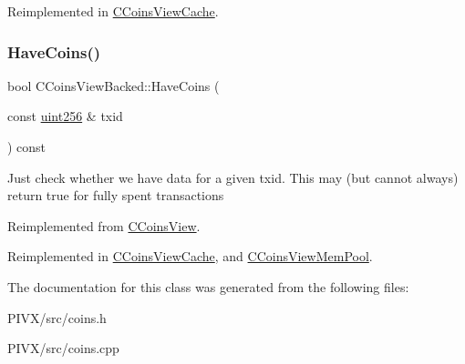 Reimplemented in \mbox{\hyperlink{class_c_coins_view_cache_a561bb7c6c97701b12c48fbbb563d0a91}{C\+Coins\+View\+Cache}}.

\mbox{\label{class_c_coins_view_backed_ad49041658bdec807d556e080476e6543}} 
\subsubsection{\texorpdfstring{Have\+Coins()}{HaveCoins()}}
{\footnotesize\ttfamily bool C\+Coins\+View\+Backed\+::\+Have\+Coins (\begin{DoxyParamCaption}\item[{const \mbox{\hyperlink{classuint256}{uint256}} \&}]{txid }\end{DoxyParamCaption}) const\hspace{0.3cm}{\ttfamily [virtual]}}

Just check whether we have data for a given txid. This may (but cannot always) return true for fully spent transactions 

Reimplemented from \mbox{\hyperlink{class_c_coins_view_ade3a65fc3f1b02baf7bebce630e4eba3}{C\+Coins\+View}}.



Reimplemented in \mbox{\hyperlink{class_c_coins_view_cache_aa8f0c55b6fc207d2188948a565125ab7}{C\+Coins\+View\+Cache}}, and \mbox{\hyperlink{class_c_coins_view_mem_pool_a2c5900448dc5570053060686ad1f014b}{C\+Coins\+View\+Mem\+Pool}}.



The documentation for this class was generated from the following files\+:\begin{DoxyCompactItemize}
\item 
P\+I\+V\+X/src/coins.\+h\item 
P\+I\+V\+X/src/coins.\+cpp\end{DoxyCompactItemize}
